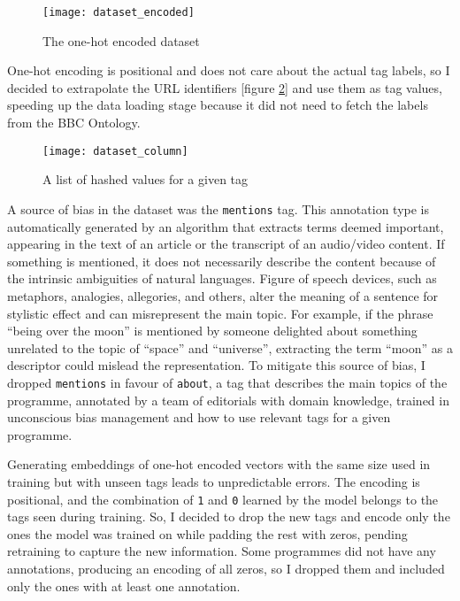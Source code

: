 \begin{figure}[h]
  \centering
  \texttt{[image: dataset\_encoded]}
  \caption{The one-hot encoded dataset}
  \label{fig:dataset_encoded}
\end{figure}

One-hot encoding is positional and does not care about the actual tag labels,
so I decided to extrapolate the URL identifiers [figure \ref{fig:dataset_column}] and use them as tag values,
speeding up the data loading stage because it did not need to fetch the labels from the BBC Ontology.

\begin{figure}[h]
  \centering
  \texttt{[image: dataset\_column]}
  \caption{A list of hashed values for a given tag}
  \label{fig:dataset_column}
\end{figure}


A source of bias in the dataset was the \verb|mentions| tag.
This annotation type is automatically generated by an algorithm that extracts terms deemed important,
appearing in the text of an article or the transcript of an audio/video content.
If something is mentioned, it does not necessarily describe the content because of the intrinsic ambiguities of natural languages.
Figure of speech devices, such as metaphors, analogies, allegories, and others, alter the meaning of a sentence for stylistic effect
and can misrepresent the main topic.
For example, if the phrase ``being over the moon'' is mentioned by someone delighted about something unrelated to the topic of ``space'' and ``universe'',
extracting the term ``moon'' as a descriptor could mislead the representation.
To mitigate this source of bias, I dropped \verb|mentions| in favour of \verb|about|,
a tag that describes the main topics of the programme, annotated by a team of editorials with domain knowledge,
trained in unconscious bias management and how to use relevant tags for a given programme.

Generating embeddings of one-hot encoded vectors with the same size used in training but with
unseen tags leads to unpredictable errors.
The encoding is positional, and the combination of \verb|1| and \verb|0| learned by the model
belongs to the tags seen during training. So, I decided to drop the new tags and encode only the ones the model was trained on
while padding the rest with zeros, pending retraining to capture the new information.
Some programmes did not have any annotations, producing an encoding of all zeros,
so I dropped them and included only the ones with at least one annotation.
